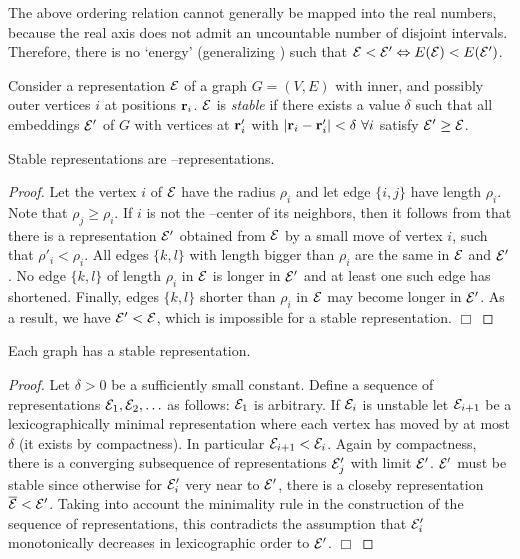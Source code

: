 \documentclass[invmat]{svjour}
\begin{document}
The above ordering relation cannot generally be mapped into the real
numbers, because the real axis does not admit an uncountable number
of disjoint intervals.
Therefore, there is no `energy' (generalizing
) such that $\mathcal{E} < \mathcal{E}' \Leftrightarrow E(\mathcal{E})
< E(\mathcal{E}')$.

\begin{definition}
\label{d:minimum}
Consider a representation $\mathcal{E}$ of a graph $G=(V,E)$ with inner, and possibly
outer vertices $i$ at positions $\mathbf{r}_i$. $\mathcal{E}$ is \emph{stable}
if there exists a value $\delta$ such that all embeddings $\mathcal{E}'$ of $G$
with vertices at $\mathbf{r}_i'$ with $|\mathbf{r}_i -\mathbf{r}'_i| < \delta\ \forall i$
satisfy $\mathcal{E}' \ge \mathcal{E}$.
\end{definition}

\begin{proposition}
Stable representations are \M--representations.
\end{proposition}

\begin{proof}
Let the vertex $i$ of $\mathcal{E}$ have the radius $\rho_i$ and let edge
$\{i,j\}$ have length $\rho_i$.  Note that $\rho_j \ge \rho_i$. If
$i$ is not the \M--center of its neighbors, then it follows from
 that there is a representation $\mathcal{E}'$ obtained
from $\mathcal{E}$ by a small move of vertex $i$, such that
$\rho'_i< \rho_i$.  All edges $\{k,l\}$ with length bigger than $\rho_i$
 are the same in $\mathcal{E}$ and $\mathcal{E}'$.
No edge $\{k,l\}$ of length $\rho_i$ in $\mathcal{E}$ is longer in
$\mathcal{E}'$ and at least one such edge has shortened.
Finally, edges $\{k,l\}$ shorter than $\rho_i$
in $\mathcal{E}$ may become longer in $\mathcal{E}'$. As a result, we have $\mathcal{E}'<
\mathcal{E}$, which is impossible for a stable representation. $\Box$
\end{proof}
\begin{proposition}
Each graph has a stable representation.
\end{proposition}

\begin{proof}
Let $\delta > 0 $ be a sufficiently small constant.  Define a sequence
of representations $\mathcal{E}_1, \mathcal{E}_2 , \ldots$ as follows: $\mathcal{E}_1$
is arbitrary. If  $\mathcal{E}_i$ is unstable let  $\mathcal{E}_{i+1}$ be a
lexicographically minimal representation where each vertex has moved by
at most $\delta$ (it exists by compactness). In particular
$\mathcal{E}_{i+1}< \mathcal{E}_i$.
Again by compactness, there is a converging subsequence of representations
$\mathcal{E}_j'$ with limit $\mathcal{E}'$.  $\mathcal{E}'$ must be stable since otherwise
for $\mathcal{E}_i'$ very near to $\mathcal{E}'$, there is a closeby representation
$\overline{\mathcal{E}}< \mathcal{E}'$. Taking into account the minimality rule in
the construction of the sequence of representations, this  contradicts
the assumption that $\mathcal{E}_{i}'$ monotonically decreases in lexicographic
order to $\mathcal{E}'$. $\Box$
\end{proof}
\end{document}
